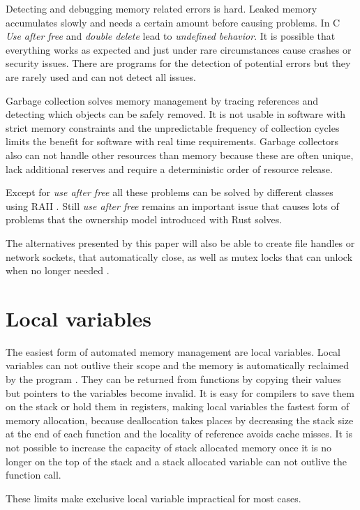 \documentclass[conference,twocolumn]{IEEEtran}
\begin{document}
Detecting and debugging memory related errors is hard. Leaked memory accumulates slowly and needs a certain amount before causing problems. In C \emph{Use after free} and \emph{double delete} lead to \emph{undefined behavior}. It is possible that everything works as expected and just under rare circumstances cause crashes or security issues. There are programs for the detection of potential errors but they are rarely used and can not detect all issues.

Garbage collection solves memory management by tracing references and detecting which objects can be safely removed. It is not usable in software with strict memory constraints and the unpredictable frequency of collection cycles limits the benefit for software with real time requirements.
Garbage collectors also can not handle other resources than memory because these are often unique, lack additional reserves and require a deterministic order of resource release.


Except for \emph{use after free} all these problems can be solved by different classes using RAII \cite{stroustrupFoundationsCpp}. Still \emph{use after free} remains an important issue that causes lots of problems that the ownership model introduced with Rust \cite{RustBook} solves.
 
The alternatives presented by this paper will also be able to create file handles or network sockets, that automatically close, as well as mutex locks that can unlock when no longer needed \cite{stroustrupFoundationsCpp}.


\section{Local variables}
The easiest form of automated memory management are local variables. Local variables can not outlive their scope and the memory is automatically reclaimed by the program \cite{cpp14std}. They can be returned from functions by copying their values but pointers to the variables become invalid. It is easy for compilers to save them on the stack or hold them in registers, making local variables the fastest form of memory allocation, because deallocation takes places by decreasing the stack size at the end of each function and the locality of reference avoids cache misses. It is not possible to increase the capacity of stack allocated memory once it is no longer on the top of the stack and a stack allocated variable can not outlive the function call.

These limits make exclusive local variable impractical for most cases.
\end{document}
